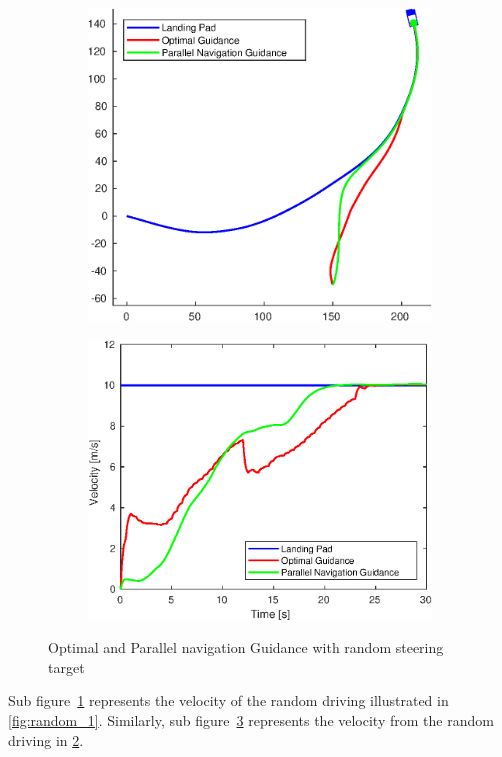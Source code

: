 \begin{figure}[ht!]
\begin{subfigure}[b]{.5\textwidth}
		\label{fig:random_1_vel}
	\end{subfigure}
	\begin{subfigure}[b]{.5\textwidth}
		\centering
		\includegraphics[width=\linewidth]{img/plot/simulation/random_2.eps}
		\label{fig:random_2}
	\end{subfigure}%
	\begin{subfigure}[b]{.5\textwidth}
		\centering
		\includegraphics[width=\linewidth]{img/plot/simulation/random_2_vel.eps}
		\label{fig:random_2_vel}
	\end{subfigure}
	\caption{Optimal and Parallel navigation Guidance with random steering target}\label{fig:rand_target}
\end{figure}
Sub figure~\ref{fig:random_1_vel} represents the velocity of the random driving illustrated in \ref{fig:random_1}. Similarly, sub figure~\ref{fig:random_2_vel} represents the velocity from the random driving in \ref{fig:random_2}. 


